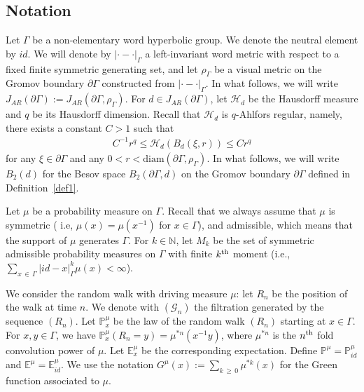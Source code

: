 \documentclass[AHL,Unicode,longabstracts,published]{cedram}
\newcommand{\ch}{\mathcal{H}}
\newcommand{\cG}{\mathcal{G}}
\newcommand{\bp}{\mathbb{P}}
\newcommand{\bn}{\mathbb{N}}
\newcommand{\be}{\mathbb{E}}
\newcommand{\diam}{\mathrm{diam}}
\begin{document}
\subsection*{Notation}

Let $\Gamma$ be a non-elementary word hyperbolic group. We denote the neutral element by ${id}$. We will denote by $|\cdot-\cdot|_{\Gamma}$ a left-invariant word metric with respect to a fixed finite symmetric generating set, and let $\rho_{\Gamma}$ be a visual metric on the Gromov boundary $\partial \Gamma$ constructed from $|\cdot-\cdot|_{\Gamma}$. In what follows, we will write $J_{AR}(\partial\Gamma):=J_{AR}(\partial\Gamma,\rho_{\Gamma})$. For $d\in J_{AR}(\partial\Gamma)$, let $\ch_{d}$ be the Hausdorff measure and $q$ be its Hausdorff dimension. Recall that $\ch_{d}$ is $q$-Ahlfors regular, namely, there exists a constant $C>1$ such that
\begin{align*}
C^{-1}r^q \leq\ch_{d}(B_{d}(\xi,r))\leq Cr^{q}
\end{align*}
for any $\xi\in\partial\Gamma$ and any $0<r<\diam(\partial\Gamma,\rho_{\Gamma})$. In what follows, we will write $B_2(d)$ for the Besov space $B_2(\partial\Gamma,d)$ on the Gromov boundary $\partial\Gamma$ defined in Definition~\ref{def1}.

Let $\mu$ be a probability measure on $\Gamma$. Recall that we always assume that $\mu$ is symmetric ( i.e, $\mu(x)=\mu(x^{-1})$ for $x\in\Gamma$), and admissible, which means that the support of $\mu$ generates $\Gamma$. For $k\in\bn$, let $M_k$ be the set of symmetric admissible probability measures on $\Gamma$ with finite $k^{\rm th}$ moment (i.e., $\sum_{x\,\in\,\Gamma}|id-x|_{\Gamma}^k\mu(x)<\infty$).


We consider the random walk with driving measure $\mu$: let $R_n$ be the position of the walk at time $n$. We denote with $(\cG_n)$ the filtration generated by the sequence $(R_n)$. Let $\bp_x^{\mu}$ be the law of the random walk $(R_n)$ starting at $x\in\Gamma$. For $x,y\in\Gamma$, we have $\bp_x^{\mu}(R_n=y)=\mu^{*n}(x^{-1}y)$, where $\mu^{*n}$ is the $n^{\rm th}$ fold convolution power of $\mu$. Let $\be_x^\mu$ be the corresponding expectation. Define $\bp^{\mu}=\bp^{\mu}_{id}$ and $\be^\mu=\be^\mu_{id}$. We use the notation $G^{\mu}(x):=\sum_{k\,\geq\,0}\mu^{*k}(x)$ for the Green function associated to $\mu$.
\end{document}
